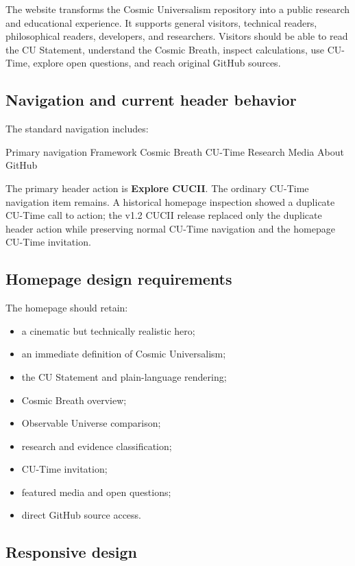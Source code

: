\documentclass[11pt,letterpaper]{article}
\newcommand{\term}[1]{\textbf{\textsf{#1}}}
\begin{document}
The website transforms the Cosmic Universalism repository into a public
research and educational experience. It supports general visitors, technical
readers, philosophical readers, developers, and researchers. Visitors should
be able to read the CU Statement, understand the Cosmic Breath, inspect
calculations, use CU-Time, explore open questions, and reach original GitHub
sources.

\subsection{Navigation and current header behavior}

The standard navigation includes:

\begin{codebox}{Primary navigation}
Framework
Cosmic Breath
CU-Time
Research
Media
About
GitHub
\end{codebox}

The primary header action is \term{Explore CUCII}. The ordinary CU-Time
navigation item remains. A historical homepage inspection showed a duplicate
CU-Time call to action; the v1.2 CUCII release replaced only the duplicate
header action while preserving normal CU-Time navigation and the homepage
CU-Time invitation.

\subsection{Homepage design requirements}

The homepage should retain:

\begin{itemize}
    \item a cinematic but technically realistic hero;
    \item an immediate definition of Cosmic Universalism;
    \item the CU Statement and plain-language rendering;
    \item Cosmic Breath overview;
    \item Observable Universe comparison;
    \item research and evidence classification;
    \item CU-Time invitation;
    \item featured media and open questions;
    \item direct GitHub source access.
\end{itemize}

\subsection{Responsive design}
\end{document}
